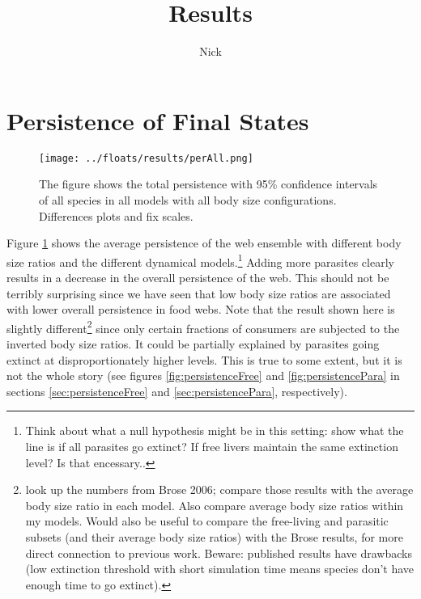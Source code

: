 \documentclass[11pt]{amsart}
\title{Results}
\author{Nick}
\begin{document}
\section{Persistence of Final States}


\begin{figure}[h] 
\captionsetup[subfigure]{labelfont = it, textfont = it,labelformat = parens,labelsep = space}
    \begin{minipage}{.45\textwidth}
    \end{minipage}
    \begin{minipage}{.45\textwidth}
    \end{minipage}
    \texttt{[image: ../floats/results/perAll.png]}
        \caption{The figure shows the total persistence with 95\% confidence intervals of all species in all models with all body size configurations.  Differences plots and fix scales.}
    \begin{minipage}{.45\textwidth}
    \end{minipage}
    \begin{minipage}{.45\textwidth}
    \end{minipage}
\label{fig:persistenceAll}
\end{figure}

Figure \ref{fig:persistenceAll} shows the average persistence of the web ensemble with different body size ratios and the different dynamical models.\footnote{Think about what a null hypothesis might be in this setting: show what the line is if all parasites go extinct?  If free livers maintain the same extinction level?  Is that encessary..}  Adding more parasites clearly results in a decrease in the overall persistence of the web.  This should not be terribly surprising since we have seen that low body size ratios are associated with lower overall persistence in food webs.  Note that the result shown here is slightly different\footnote{look up the numbers from Brose 2006; compare those results with the average body size ratio in each model.  Also compare average body size ratios within my models.  Would also be useful to compare the free-living and parasitic subsets (and their average body size ratios) with the Brose results, for more direct connection to previous work.  Beware: published results have drawbacks (low extinction threshold with short simulation time means species don't have enough time to go extinct).} since only certain fractions of consumers are subjected to the inverted body size ratios. It could be partially explained by parasites going extinct at disproportionately higher levels.  This is true to some extent, but it is not the whole story (see figures \ref{fig:persistenceFree} and \ref{fig:persistencePara} in sections \ref{sec:persistenceFree} and \ref{sec:persistencePara}, respectively).
\end{document}

